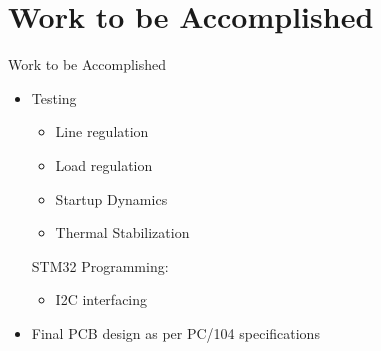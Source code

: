 \documentclass[aspectratio=169]{beamer}
\begin{document}
	\section{Work to be Accomplished}
							\begin{frame}{Work to be Accomplished}
		\begin{itemize}
			\item  Testing
			\begin{itemize}
				\item Line regulation
				\item Load regulation
				\item Startup Dynamics
				\item Thermal Stabilization
		\end{itemize}
	STM32 Programming:
			\begin{itemize}
				\item I2C interfacing
			\end{itemize}
				\item Final PCB design as per PC/104 specifications
			
		\end{itemize}
	\end{frame}
	
	

			
				
		
				
\end{document}
